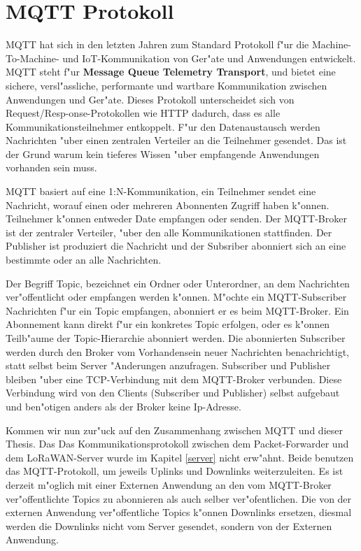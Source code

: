 \section{MQTT Protokoll}

MQTT hat sich in den letzten Jahren zum Standard Protokoll f"ur die
Machine-To-Machine- und IoT-Kommunikation von Ger"ate und Anwendungen
entwickelt. MQTT steht f"ur \textbf{Message Queue Telemetry Transport},
und bietet eine sichere, versl"assliche, performante und wartbare
Kommunikation zwischen Anwendungen und Ger"ate. Dieses Protokoll
unterscheidet sich von Request/Resp-onse-Protokollen wie \ac{HTTP} 
dadurch, dass es alle Kommunikationsteilnehmer entkoppelt. F"ur den
Datenaustausch werden Nachrichten "uber einen zentralen Verteiler an 
die Teilnehmer gesendet. Das ist der Grund warum kein tieferes Wissen 
"uber empfangende Anwendungen vorhanden sein muss.

MQTT basiert auf eine 1:N-Kommunikation, ein Teilnehmer sendet eine
Nachricht, worauf einen oder mehreren Abonnenten Zugriff haben k"onnen.
Teilnehmer k"onnen entweder Date empfangen oder senden. Der MQTT-Broker
ist der zentraler Verteiler, "uber den alle Kommunikationen stattfinden.
Der Publisher ist produziert die Nachricht und der Subsriber abonniert
sich an eine bestimmte oder an alle Nachrichten. 

Der Begriff  Topic, bezeichnet ein Ordner oder Unterordner, an dem
Nachrichten ver"offentlicht oder empfangen werden k"onnen. M"ochte ein
MQTT-Subscriber Nachrichten f"ur ein Topic empfangen, abonniert er es
beim MQTT-Broker. Ein Abonnement kann direkt f"ur ein konkretes Topic
erfolgen, oder es k"onnen Teilb"aume der Topic-Hierarchie abonniert
werden. Die abonnierten Subscriber werden durch den Broker vom
Vorhandensein neuer Nachrichten benachrichtigt, statt selbst beim 
Server "Anderungen anzufragen. Subscriber und Publisher bleiben "uber 
eine \ac{TCP}-Verbindung mit dem MQTT-Broker verbunden. Diese 
Verbindung wird von den Clients (Subscriber und Publisher) selbst 
aufgebaut und ben"otigen anders als der Broker keine Ip-Adresse. 

Kommen wir nun zur"uck auf den Zusammenhang zwischen MQTT und dieser
Thesis. Das Das Kommunikationsprotokoll zwischen dem Packet-Forwarder und 
dem LoRaWAN-Server wurde im Kapitel \ref{server} nicht erw"ahnt. Beide
benutzen das MQTT-Protokoll, um jeweils Uplinks und Downlinks
weiterzuleiten. Es ist derzeit m"oglich mit einer Externen Anwendung an
den vom MQTT-Broker ver"offentlichte Topics zu abonnieren als auch 
selber ver"ofentlichen. Die von der externen Anwendung ver"offentliche 
Topics k"onnen Downlinks ersetzen, diesmal werden die Downlinks nicht 
vom Server gesendet, sondern von der Externen Anwendung.


